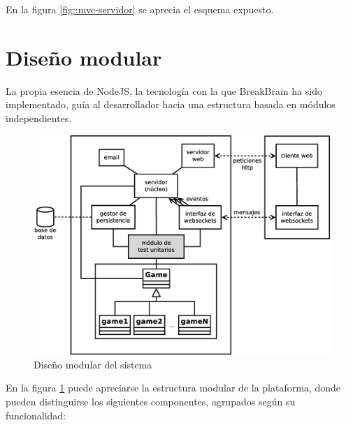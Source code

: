 En la figura \ref{fig::mvc-servidor} se aprecia el esquema expuesto.

\section{Diseño modular}

La propia esencia de NodeJS, la tecnología con la que BreakBrain ha sido implementado, guía al desarrollador hacia una estructura basada en módulos independientes.

\vspace{0.1cm}
\begin{figure}[H]
  \begin{center}
    \includegraphics[width=\textwidth]{images/diseno.eps}
    \caption{Diseño modular del sistema}
    \label{fig::diseno}
  \end{center}
\end{figure}

En la figura \ref{fig::diseno} puede apreciarse la estructura modular de la plataforma, donde pueden distinguirse los siguientes componentes, agrupados según su funcionalidad:

